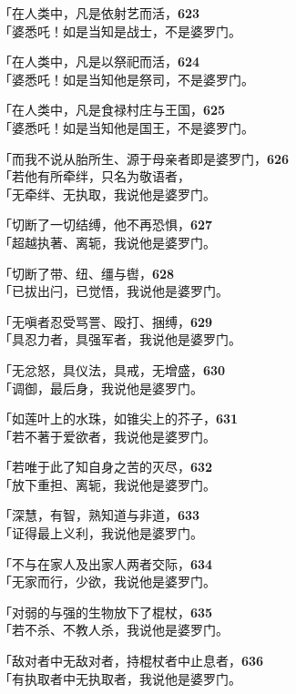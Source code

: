 「在人类中，凡是依射艺而活，\hfill{\grayfootnotesize \textbf{623}} \\
「婆悉吒！如是当知是战士，不是婆罗门。


「在人类中，凡是以祭祀而活，\hfill{\grayfootnotesize \textbf{624}} \\
「婆悉吒！如是当知他是祭司，不是婆罗门。

「在人类中，凡是食禄村庄与王国，\hfill{\grayfootnotesize \textbf{625}} \\
「婆悉吒！如是当知他是国王，不是婆罗门。

「而我不说从胎所生、源于母亲者即是婆罗门，\hfill{\grayfootnotesize \textbf{626}} \\
「若他有所牵绊，只名为敬语者，\\
「无牵绊、无执取，我说他是婆罗门。


「切断了一切结缚，他不再恐惧，\hfill{\grayfootnotesize \textbf{627}} \\
「超越执著、离轭，我说他是婆罗门。


「切断了带、纽、缰与辔，\hfill{\grayfootnotesize \textbf{628}} \\
「已拔出闩，已觉悟，我说他是婆罗门。


「无嗔者忍受骂詈、殴打、捆缚，\hfill{\grayfootnotesize \textbf{629}} \\
「具忍力者，具强军者，我说他是婆罗门。


「无忿怒，具仪法，具戒，无增盛，\hfill{\grayfootnotesize \textbf{630}} \\
「调御，最后身，我说他是婆罗门。


「如莲叶上的水珠，如锥尖上的芥子，\hfill{\grayfootnotesize \textbf{631}} \\
「若不著于爱欲者，我说他是婆罗门。


「若唯于此了知自身之苦的灭尽，\hfill{\grayfootnotesize \textbf{632}} \\
「放下重担、离轭，我说他是婆罗门。


「深慧，有智，熟知道与非道，\hfill{\grayfootnotesize \textbf{633}} \\
「证得最上义利，我说他是婆罗门。


「不与在家人及出家人两者交际，\hfill{\grayfootnotesize \textbf{634}} \\
「无家而行，少欲，我说他是婆罗门。


「对弱的与强的生物放下了棍杖，\hfill{\grayfootnotesize \textbf{635}} \\
「若不杀、不教人杀，我说他是婆罗门。


「敌对者中无敌对者，持棍杖者中止息者，\hfill{\grayfootnotesize \textbf{636}} \\
「有执取者中无执取者，我说他是婆罗门。


